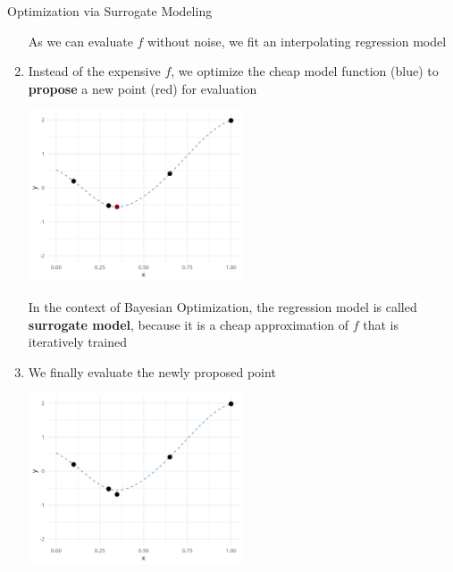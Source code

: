 \documentclass[11pt,compress,t,notes=noshow, xcolor=table]{beamer}
\begin{document}
\begin{vbframe}{Optimization via Surrogate Modeling}
\begin{enumerate}
\vspace{-.1cm}
As we can evaluate $f$ without noise, we fit an interpolating regression model

\framebreak 

\item Instead of the expensive $f$, we optimize the cheap model function (blue) to \textbf{propose} a new point (red) for evaluation 
\vspace{+.05cm}

\begin{center}
  \includegraphics[width = 0.5\textwidth]{figure_man/loop_2.png}
\end{center}

\vspace{-.1cm}
In the context of Bayesian Optimization, the regression model is called \textbf{surrogate model}, because it is a cheap approximation of $f$ that is iteratively trained

\framebreak 

\item We finally evaluate the newly proposed point
\vspace{+.45cm}

\begin{center}
  \includegraphics[width = 0.5\textwidth]{figure_man/loop_3.png}
\end{center}

\end{enumerate}


\end{vbframe}
\end{document}
